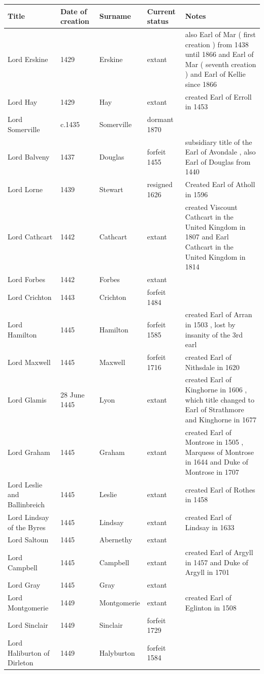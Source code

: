 \documentclass{article}
\begin{document}
\begin{tabular}{lllll}
\toprule
Title & Date of creation & Surname & Current status & Notes \\
\midrule
Lord Erskine & 1429 & Erskine & extant & also Earl of Mar ( first creation ) from 1438 until 1866 and Earl of Mar ( seventh creation ) and Earl of Kellie since 1866 \\
Lord Hay & 1429 & Hay & extant & created Earl of Erroll in 1453 \\
Lord Somerville & c.1435 & Somerville & dormant 1870 &  \\
Lord Balveny & 1437 & Douglas & forfeit 1455 & subsidiary title of the Earl of Avondale , also Earl of Douglas from 1440 \\
Lord Lorne & 1439 & Stewart & resigned 1626 & Created Earl of Atholl in 1596 \\
Lord Cathcart & 1442 & Cathcart & extant & created Viscount Cathcart in the United Kingdom in 1807 and Earl Cathcart in the United Kingdom in 1814 \\
Lord Forbes & 1442 & Forbes & extant &  \\
Lord Crichton & 1443 & Crichton & forfeit 1484 &  \\
Lord Hamilton & 1445 & Hamilton & forfeit 1585 & created Earl of Arran in 1503 , lost by insanity of the 3rd earl \\
Lord Maxwell & 1445 & Maxwell & forfeit 1716 & created Earl of Nithsdale in 1620 \\
Lord Glamis & 28 June 1445 & Lyon & extant & created Earl of Kinghorne in 1606 , which title changed to Earl of Strathmore and Kinghorne in 1677 \\
Lord Graham & 1445 & Graham & extant & created Earl of Montrose in 1505 , Marquess of Montrose in 1644 and Duke of Montrose in 1707 \\
Lord Leslie and Ballinbreich & 1445 & Leslie & extant & created Earl of Rothes in 1458 \\
Lord Lindsay of the Byres & 1445 & Lindsay & extant & created Earl of Lindsay in 1633 \\
Lord Saltoun & 1445 & Abernethy & extant &  \\
Lord Campbell & 1445 & Campbell & extant & created Earl of Argyll in 1457 and Duke of Argyll in 1701 \\
Lord Gray & 1445 & Gray & extant &  \\
Lord Montgomerie & 1449 & Montgomerie & extant & created Earl of Eglinton in 1508 \\
Lord Sinclair & 1449 & Sinclair & forfeit 1729 &  \\
Lord Haliburton of Dirleton & 1449 & Halyburton & forfeit 1584 &  \\
\bottomrule
\end{tabular}
\end{document}

